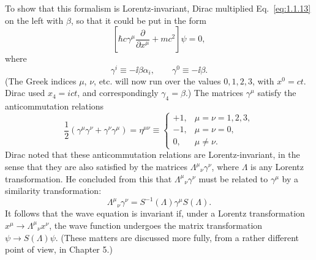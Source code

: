 To show that this formalism is Lorentz-invariant, Dirac multiplied
Eq.~\eqref{eq:1.1.13} on the left with $\beta$, so that it could be put in the form
\begin{equation}
  \left[\hbar c\gamma^\mu\frac{\partial}{\partial x^\mu}+mc^2\right]\psi=0,
  \tag{1.1.19}\label{eq:1.1.19}
\end{equation}
where
\begin{equation}
  \gamma^i\equiv-\ii\beta\alpha_i,
  \qquad
  \gamma^0\equiv-\ii\beta.
  \tag{1.1.20}\label{eq:1.1.20}
\end{equation}
(The Greek indices $\mu$, $\nu$, etc. will now run over the values $0,1,2,3$, with
$x^0=ct$. Dirac used $x_4=ict$, and correspondingly $\gamma_4=\beta$.) The matrices
$\gamma^\mu$ satisfy the anticommutation relations
\begin{equation}
  \frac12(\gamma^\mu\gamma^\nu+\gamma^\nu\gamma^\mu)
  =\eta^{\mu\nu}\equiv
  \begin{cases}
    +1,&\mu=\nu=1,2,3,\\
    -1,&\mu=\nu=0,\\
    0,&\mu\neq\nu.
  \end{cases}
  \tag{1.1.21}\label{eq:1.1.21}
\end{equation}
Dirac noted that these anticommutation relations are Lorentz-invariant,
in the sense that they are also satisfied by the matrices
$\Lambda^\mu{}_{\nu}\gamma^\nu$, where $\Lambda$ is
any Lorentz transformation. He concluded from this that $\Lambda^\mu{}_{\nu}\gamma^\nu$ must be
related to $\gamma^\mu$ by a similarity transformation:
\begin{equation*}
  \Lambda^\mu{}_{\nu}\gamma^\nu=S^{-1}(\Lambda)\gamma^\mu S(\Lambda).
\end{equation*}
It follows that the wave equation is invariant if, under a Lorentz transformation
$x^\mu\to\Lambda^\mu{}_{\nu}x^\nu$, the wave function undergoes the matrix transformation
$\psi\to S(\Lambda)\psi$. (These matters are discussed more fully, from a rather
different point of view, in Chapter 5.)


